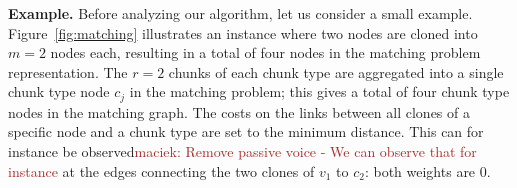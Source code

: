 \documentclass[9pt]{sigcomm-alternate}
\newcommand{\maciek}[1]{\textcolor{brown}{maciek: #1}}
\newcommand{\MaFactor}{m}
\newcommand{\RedundancyFactor}{\ensuremath{r}}
\newcommand{\VmChunkAssignment}{\mu}
\newcommand{\NodeMapping}{\pi}
\newcommand{\VirtualNode}{v}
\newcommand{\achunk}{\ensuremath{c}}
\newcommand{\RS}{\textsc{RS}}
\newcommand{\MA}{\textsc{MA}}
\begin{document}
\textbf{Example.} Before analyzing our algorithm, let us consider a small example.
%
%
%
Figure~\ref{fig:matching} illustrates
an instance where two nodes are
cloned into $\MaFactor = 2$ nodes each, resulting in a total of four nodes in
the matching problem representation.
The $\RedundancyFactor = 2$ chunks of each chunk type are
aggregated into a single chunk type node $\achunk_j$  in the matching problem;
this gives a total of four chunk type nodes in the matching graph. The costs
on the links between all clones of a specific node and a chunk type are set to
the minimum distance. This can for instance be observed\maciek{Remove passive voice - We can observe that for instance} at the edges connecting
the two clones of $\VirtualNode_1$ to $\achunk_2$: both weights are 0.
\end{document}
